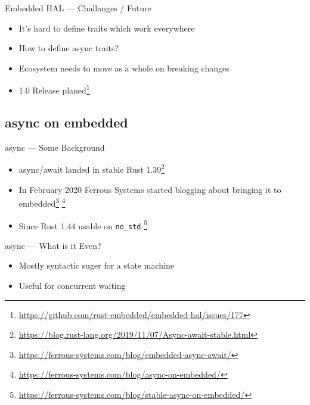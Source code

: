 \documentclass[aspectratio=1610,14pt,t]{beamer}
\begin{document}
\begin{frame}[c]{Embedded HAL --- Challanges / Future}
  \begin{itemize}
  \item It's hard to define traits which work everywhere

  \item How to define async traits?
  \item Ecosystem needs to move as a whole on breaking changes
  \item 1.0 Release planed\footnote{\url{https://github.com/rust-embedded/embedded-hal/issues/177}}
  \end{itemize}
\end{frame}

\subsection{async on embedded}
\begin{frame}[c]{async --- Some Background}
  \begin{itemize}
    \item async/await landed in stable Rust 1.39\footnote{\url{https://blog.rust-lang.org/2019/11/07/Async-await-stable.html}}
    \item In February 2020 Ferrous Systems started blogging about bringing it
      to embedded\footnote{\url{https://ferrous-systems.com/blog/embedded-async-await/}}
      \footnote{\url{https://ferrous-systems.com/blog/async-on-embedded/}}
    \item Since Rust 1.44 usable on \texttt{no\_std}
      \footnote{\url{https://ferrous-systems.com/blog/stable-async-on-embedded/}}
  \end{itemize}
\end{frame}

\begin{frame}[c]{async --- What is it Even?}
  \begin{itemize}
    \item Mostly syntactic suger for a state machine
    \item Useful for concurrent waiting
  \end{itemize}
\end{frame}
\end{document}
